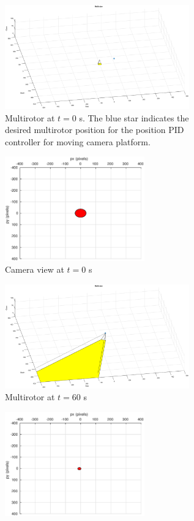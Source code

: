 \begin{figure}[htbp]
	\centering
	\begin{subfigure}{0.5\textwidth}
		\centering
		\includegraphics[height=4.5cm]{images/chapter2/uav_adaptive_0s}
		\caption{Multirotor at $t=0$ s. The blue star indicates the desired multirotor position for the position PID controller for moving camera platform.}
	\end{subfigure}%
	\begin{subfigure}{0.5\textwidth}
		\centering
		\includegraphics[height=4.5cm]{images/chapter2/camera_adaptive_0s}
		\caption{Camera view at $t=0$ s}
	\end{subfigure}
	\begin{subfigure}{0.5\textwidth}
		\centering
		\includegraphics[height=4.5cm]{images/chapter2/uav_adaptive_60s}
		\caption{Multirotor at $t=60$ s}
	\end{subfigure}%
	\begin{subfigure}{0.5\textwidth}
		\centering
		\includegraphics[height=4.5cm]{images/chapter2/camera_adaptive_60s}

\end{subfigure}
\end{figure}
